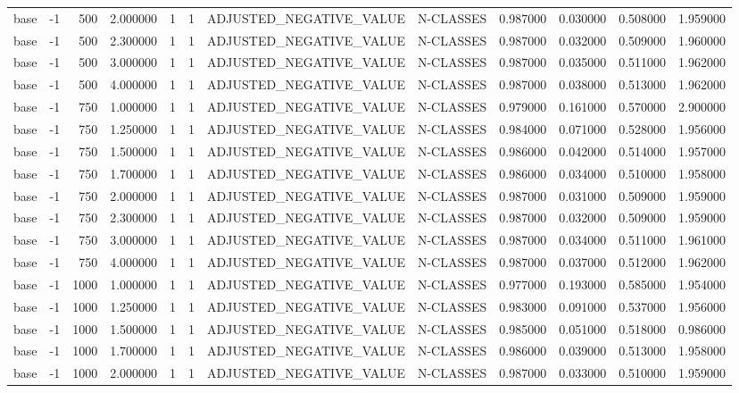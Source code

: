\begin{tabular}{lrrrllllrrrr}
base & -1 & 500 & 2.000000 & 1 & 1 & ADJUSTED_NEGATIVE_VALUE & N-CLASSES & 0.987000 & 0.030000 & 0.508000 & 1.959000 \\
base & -1 & 500 & 2.300000 & 1 & 1 & ADJUSTED_NEGATIVE_VALUE & N-CLASSES & 0.987000 & 0.032000 & 0.509000 & 1.960000 \\
base & -1 & 500 & 3.000000 & 1 & 1 & ADJUSTED_NEGATIVE_VALUE & N-CLASSES & 0.987000 & 0.035000 & 0.511000 & 1.962000 \\
base & -1 & 500 & 4.000000 & 1 & 1 & ADJUSTED_NEGATIVE_VALUE & N-CLASSES & 0.987000 & 0.038000 & 0.513000 & 1.962000 \\
base & -1 & 750 & 1.000000 & 1 & 1 & ADJUSTED_NEGATIVE_VALUE & N-CLASSES & 0.979000 & 0.161000 & 0.570000 & 2.900000 \\
base & -1 & 750 & 1.250000 & 1 & 1 & ADJUSTED_NEGATIVE_VALUE & N-CLASSES & 0.984000 & 0.071000 & 0.528000 & 1.956000 \\
base & -1 & 750 & 1.500000 & 1 & 1 & ADJUSTED_NEGATIVE_VALUE & N-CLASSES & 0.986000 & 0.042000 & 0.514000 & 1.957000 \\
base & -1 & 750 & 1.700000 & 1 & 1 & ADJUSTED_NEGATIVE_VALUE & N-CLASSES & 0.986000 & 0.034000 & 0.510000 & 1.958000 \\
base & -1 & 750 & 2.000000 & 1 & 1 & ADJUSTED_NEGATIVE_VALUE & N-CLASSES & 0.987000 & 0.031000 & 0.509000 & 1.959000 \\
base & -1 & 750 & 2.300000 & 1 & 1 & ADJUSTED_NEGATIVE_VALUE & N-CLASSES & 0.987000 & 0.032000 & 0.509000 & 1.959000 \\
base & -1 & 750 & 3.000000 & 1 & 1 & ADJUSTED_NEGATIVE_VALUE & N-CLASSES & 0.987000 & 0.034000 & 0.511000 & 1.961000 \\
base & -1 & 750 & 4.000000 & 1 & 1 & ADJUSTED_NEGATIVE_VALUE & N-CLASSES & 0.987000 & 0.037000 & 0.512000 & 1.962000 \\
base & -1 & 1000 & 1.000000 & 1 & 1 & ADJUSTED_NEGATIVE_VALUE & N-CLASSES & 0.977000 & 0.193000 & 0.585000 & 1.954000 \\
base & -1 & 1000 & 1.250000 & 1 & 1 & ADJUSTED_NEGATIVE_VALUE & N-CLASSES & 0.983000 & 0.091000 & 0.537000 & 1.956000 \\
base & -1 & 1000 & 1.500000 & 1 & 1 & ADJUSTED_NEGATIVE_VALUE & N-CLASSES & 0.985000 & 0.051000 & 0.518000 & 0.986000 \\
base & -1 & 1000 & 1.700000 & 1 & 1 & ADJUSTED_NEGATIVE_VALUE & N-CLASSES & 0.986000 & 0.039000 & 0.513000 & 1.958000 \\
base & -1 & 1000 & 2.000000 & 1 & 1 & ADJUSTED_NEGATIVE_VALUE & N-CLASSES & 0.987000 & 0.033000 & 0.510000 & 1.959000 \\

\end{tabular}
